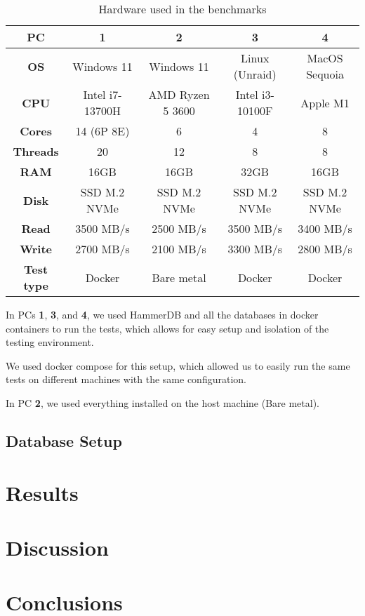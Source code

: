 \begin{table}[h!]
    \centering
    \begin{tabular}{|c|c|c|c|c|}
        \hline
        \textbf{PC}        & \textbf{1}      & \textbf{2}       & \textbf{3}      & \textbf{4}    \\
        \hline
        \textbf{OS}        & Windows 11      & Windows 11       & Linux (Unraid)  & MacOS Sequoia \\
        \hline
        \textbf{CPU}       & Intel i7-13700H & AMD Ryzen 5 3600 & Intel i3-10100F & Apple M1      \\
        \hline
        \textbf{Cores}     & 14 (6P 8E)      & 6                & 4               & 8             \\
        \hline
        \textbf{Threads}   & 20              & 12               & 8               & 8             \\
        \hline
        \textbf{RAM}       & 16GB            & 16GB             & 32GB            & 16GB          \\
        \hline
        \textbf{Disk}      & SSD M.2 NVMe    & SSD M.2 NVMe     & SSD M.2 NVMe    & SSD M.2 NVMe  \\
        \hline
        \textbf{Read}      & 3500 MB/s       & 2500 MB/s        & 3500 MB/s       & 3400 MB/s     \\
        \hline
        \textbf{Write}     & 2700 MB/s       & 2100 MB/s        & 3300 MB/s       & 2800 MB/s     \\
        \hline
        \textbf{Test type} & Docker          & Bare metal        & Docker          & Docker        \\
        \hline
    \end{tabular}
    \caption{Hardware used in the benchmarks}
    \label{t,ab:hardware-setup}
\end{table}

In PCs \textbf{1}, \textbf{3}, and \textbf{4}, we used HammerDB and all the databases in docker containers to run the tests, which allows for easy setup and isolation of the testing environment.

We used docker compose for this setup, which allowed us to easily run the same tests on different machines with the same configuration.

In PC \textbf{2}, we used everything installed on the host machine (Bare metal).

\subsection{Database Setup}
\label{sec:database-setup}

\section{Results}
\label{sec:results}

\section{Discussion}
\label{sec:discussion}

\section{Conclusions}
\label{sec:conclusions}
